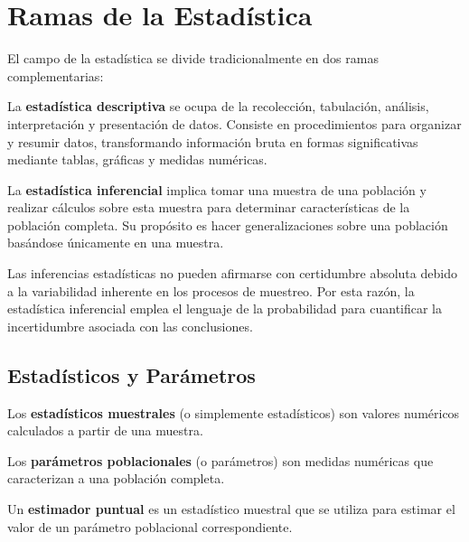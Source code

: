 \section{Ramas de la Estadística}

El campo de la estadística se divide tradicionalmente en dos ramas complementarias:

\begin{definition}
La \textbf{estadística descriptiva} se ocupa de la recolección, tabulación, análisis, interpretación y presentación de datos. Consiste en procedimientos para organizar y resumir datos, transformando información bruta en formas significativas mediante tablas, gráficas y medidas numéricas.
\end{definition}

\begin{definition}
La \textbf{estadística inferencial} implica tomar una muestra de una población y realizar cálculos sobre esta muestra para determinar características de la población completa. Su propósito es hacer generalizaciones sobre una población basándose únicamente en una muestra.
\end{definition}

\begin{remark}
Las inferencias estadísticas no pueden afirmarse con certidumbre absoluta debido a la variabilidad inherente en los procesos de muestreo. Por esta razón, la estadística inferencial emplea el lenguaje de la probabilidad para cuantificar la incertidumbre asociada con las conclusiones.
\end{remark}

\subsection{Estadísticos y Parámetros}

\begin{definition}
Los \textbf{estadísticos muestrales} (o simplemente estadísticos) son valores numéricos calculados a partir de una muestra.
\end{definition}

\begin{definition}
Los \textbf{parámetros poblacionales} (o parámetros) son medidas numéricas que caracterizan a una población completa.
\end{definition}

\begin{definition}
Un \textbf{estimador puntual} es un estadístico muestral que se utiliza para estimar el valor de un parámetro poblacional correspondiente.
\end{definition}

